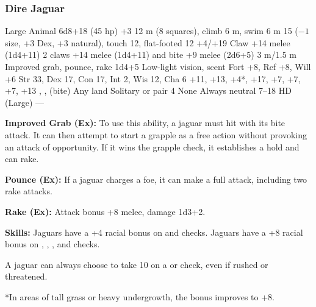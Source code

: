\subsubsection{Dire Jaguar}
\begin{MonsterStats}
{Large Animal}
{6d8+18 (45 hp)}
{+3}
{12 m (8 squares), climb 6 m, swim 6 m}
{15 ($-1$ size, +3 Dex, +3 natural), touch 12, flat-footed 12}
{+4/+19}
{Claw +14 melee (1d4+11)}
{2 claws +14 melee (1d4+11) and bite +9 melee (2d6+5)}
{3 m/1.5 m}
{Improved grab, pounce, rake 1d4+5}
{Low-light vision, scent}
{Fort +8, Ref +8, Will +6}
{Str 33, Dex 17, Con 17, Int 2, Wis 12, Cha 6}
{
     +11,
     +13,
     +4*,
     +17,
     +7,
     +7,
     +7,
     +13
}
{, ,  (bite)}
{Any land}
{Solitary or pair}
{4}
{None}
{Always neutral}
{7--18 HD (Large)}
{---}
\end{MonsterStats}

\textbf{Improved Grab (Ex):} To use this ability, a jaguar must hit with its bite attack. It can then attempt to start a grapple as a free action without provoking an attack of opportunity. If it wins the grapple check, it establishes a hold and can rake.

\textbf{Pounce (Ex):} If a jaguar charges a foe, it can make a full attack, including two rake attacks.

\textbf{Rake (Ex):} Attack bonus +8 melee, damage 1d3+2.

\textbf{Skills:} Jaguars have a +4 racial bonus on  and  checks. Jaguars have a +8 racial bonus on , , , and  checks.

A jaguar can always choose to take 10 on a  or  check, even if rushed or threatened.

*In areas of tall grass or heavy undergrowth, the  bonus improves to +8.

